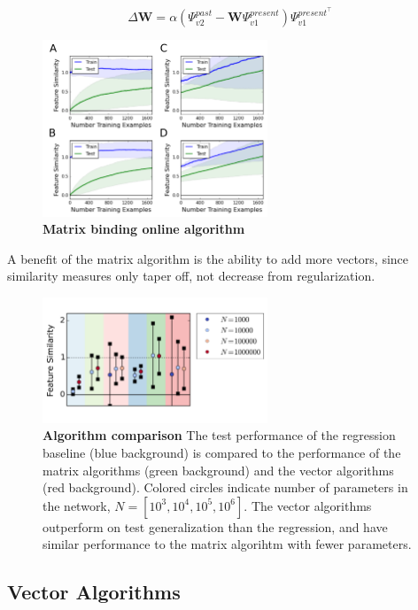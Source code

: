 \documentclass{article}
\begin{document}
\begin{equation}
\Delta \mathbf{W} = \alpha (\Psi^{past}_{v2} - \mathbf{W} \Psi^{present}_{v1}) \Psi^{present^\top}_{v1}
\end{equation}


\begin{figure}[h]
\centering
\includegraphics[width=0.6\textwidth]{outer_product_algorithm-170518.png}
\caption{\textbf{Matrix binding online algorithm}}
\end{figure}

A benefit of the matrix algorithm is the ability to add more vectors, since similarity measures only taper off, not decrease from regularization.

\begin{figure}[h]
\centering
\includegraphics[width=0.6\textwidth]{algorithm_comparison-170519.png}
\caption{\textbf{Algorithm comparison} The test performance of the regression baseline (blue background) is compared to the performance of the matrix algorithms (green background) and the vector algorithms (red background). Colored circles indicate number of parameters in the network, $N=[10^3, 10^4, 10^5, 10^6]$. The vector algorithms outperform on test generalization than the regression, and have similar performance to the matrix algorihtm with fewer parameters.}
\end{figure}

\subsection{Vector Algorithms}
\end{document}
